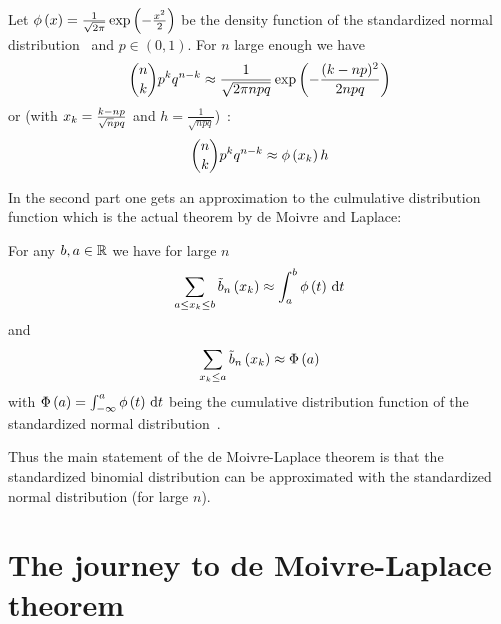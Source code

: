 
\begin{theorem}
  Let $\phi\left( {x} \right)=\frac{1}{\sqrt{2\pi}}\exp\left( {-\frac{x^2}2} \right)$ be the density function of the standardized normal distribution~\cite[p. 48]{georgii} and $p\in(0,1)$. For $n$ large enough we have~\cite[p. 65]{irle}
  \begin{align}
    \binom nk p^k q^{n-k} \approx \frac 1{\sqrt{2\pi npq}} \exp\left( {-\frac{(k-np)^2}{2npq}} \right)
  \end{align}
  or (with $x_{k}=\frac{k-np}{\sqrt npq}$ and $h=\frac1{\sqrt{npq}}$)~\cite[p. 133]{georgii}:
  \begin{align}
    \binom nk p^k q^{n-k} \approx \phi\left( {x_{k}} \right) h
  \end{align}
\end{theorem}

In the second part one gets an approximation to the culmulative distribution function which is the actual theorem by de Moivre and Laplace:


\begin{theorem}
  For any $b,a \in \mathbb R$ we have for large $n$~\cite[p. 136]{georgii}\cite[p. 67]{irle}
  \begin{align}
    \sum_{a \le x_{k}\le b} \tilde b_{n}\left({x_{k}}\right) \approx \int_a^b \phi\left( {t} \right) \,\mathrm d{t}
  \end{align}
  and
  \begin{align}
    \sum_{x_{k} \le a} \tilde b_{n}\left({x_{k}}\right) \approx \Phi\left( {a} \right)
  \end{align}
  with $\Phi\left( {a} \right) = \int_{-\infty}^a \phi\left( {t} \right) \,\mathrm d{t}$ being the cumulative distribution function of the standardized normal distribution~\cite[p. 134]{georgii}.
\end{theorem}

Thus the main statement of the de Moivre-Laplace theorem is that the standardized binomial distribution can be approximated with the standardized normal distribution (for large $n$).

\section{The journey to de Moivre-Laplace theorem}

